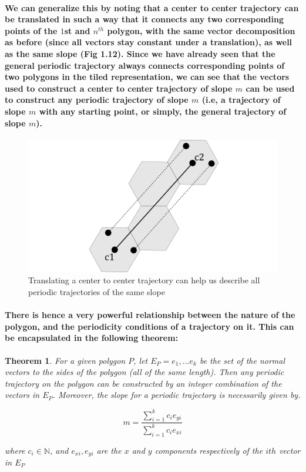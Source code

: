 \documentclass{report}
\newtheorem{theorem}{Theorem}[chapter]
\begin{document}
\paragraph{We can generalize this by noting that a center to center trajectory can be translated in such a way that it connects any two corresponding points of the $1$st and $n^{th}$ polygon, with the same vector decomposition as before (since all vectors stay constant under a translation), as well as the same slope (Fig 1.12). Since we have already seen that the general periodic trajectory always connects corresponding points of two polygons in the tiled representation, we can see that the vectors used to construct a center to center trajectory of slope $m$ can be used to construct any periodic trajectory of slope $m$ (i.e, a trajectory of slope $m$ with any starting point, or simply, the general trajectory of slope $m$).}



\begin{figure}
\begin{center}
\includegraphics[scale=0.3]{12}
\caption{Translating a center to center trajectory can help us describe all periodic trajectories of the same slope}
\end{center}
\end{figure}


\paragraph{There is hence a very powerful relationship between the nature of the polygon, and the periodicity conditions of a trajectory on it. This can be encapsulated in the following theorem:}

\pagebreak

\begin{theorem}
For a given polygon $P$, let $E_P = {e_1,...e_k}$ be the set of the normal vectors to the sides of the polygon (all of the same length). Then any periodic trajectory on the polygon can be constructed by an integer combination of the vectors in $E_P$. Moreover, the slope for a periodic trajectory is necessarily given by.

\begin{equation}
m=\frac{\sum_{i=1}^k  c_ie_{yi} }{\sum_{i=1}^k  c_ie_{xi} }  
\end{equation}

where $c_i \in \mathbb{N}$, and $e_{xi}, e_{yi}$ are the $x$ and $y$ components respectively of the $ith$ vector in $E_P$
\end{theorem}
\end{document}
